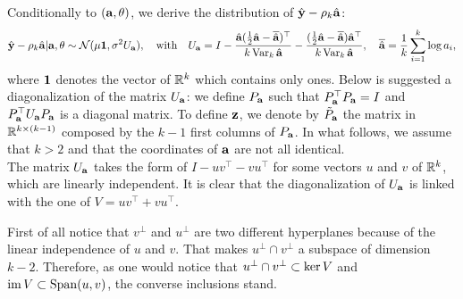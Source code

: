 Conditionally to $(\mathbf{a}, \theta)$, we derive the distribution of $\hat{\mathbf{y}}-\rho_k\hat{\mathbf{a}}$: 
    \begin{equation}\label{lowdoe:eq:likelihood2}
        \hat{\mathbf{y}} - \rho_k\hat{\mathbf{a}}|\mathbf{a}, \theta \sim\mathcal{N}(\mu \mathbf{1}, \sigma^2 U_{\mathbf{a}})  , \quad\text{with}\quad U_{\mathbf{a}} = I - \frac{\hat{\mathbf{a}}(\frac{1}{2}\hat{\mathbf{a}} - \overline{\hat{\mathbf{a}}})^{\top}  }{k\operatorname{Var}_k\hat{\mathbf{a}}} - \frac{(\frac{1}{2}\hat{\mathbf{a}} - \overline{\hat{\mathbf{a}}}) \hat{\mathbf{a}}^{\top}  }{k\operatorname{Var}_k\hat{\mathbf{a}}} ,\quad \overline{\hat{\mathbf{a}}} = \frac{1}{k}\sum_{i=1}^k \log a_i,
    \end{equation}
where $\mathbf{1}$ denotes the vector of $\mathbb{R}^k$ which contains only ones. %
Below is suggested a diagonalization of the matrix $U_{\mathbf{a}}$: we define $P_{\mathbf{a}}$ such that $P_{\mathbf{a}}^{\top}P_{\mathbf{a}}=I$ and $P_{\mathbf{a}}^{\top}U_{\mathbf{a}}P_{\mathbf{a}}$ is a diagonal matrix. To define $\mathbf{z}$, we denote by $\tilde P_{\mathbf{a}}$ the matrix in $\mathbb{R}^{k\times(k-1)}$ composed by the $k-1$ first columns of $P_{\mathbf{a}}$. {In what follows, we assume that $k>2$ and that the coordinates of $\mathbf{a}$ are not all identical.} \\


The matrix $U_{\mathbf{a}}$ takes the form of $I-uv^{\top}-vu^{\top}$ for some vectors $u$ and $v$ of $\mathbb{R}^k$, which are linearly independent. It is clear that the diagonalization of $U_{\mathbf{a}}$ is linked with the one of $V=uv^{\top}+vu^{\top}$.

First of all notice that $v^\perp$ and $u^\perp$ are two different hyperplanes because of the linear independence of $u$ and $v$. That makes $u^\perp\cap v^\perp$ a subspace of dimension $k-2$. %
Therefore, as one would notice that $u^\perp\cap v^\perp\subset\operatorname{ker} V$ and $\operatorname{im} V\subset\operatorname{Span}(u,v)$, the converse inclusions stand.

